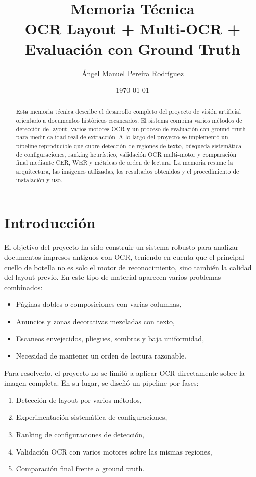 \documentclass[11pt, a4paper]{article}
\title{Memoria T\'ecnica\\OCR Layout + Multi-OCR + Evaluaci\'on con Ground Truth}
\author{Ángel Manuel Pereira Rodríguez}
\date{\today}
\begin{document}
\maketitle

\begin{abstract}
Esta memoria t\'ecnica describe el desarrollo completo del proyecto de visi\'on artificial
orientado a documentos hist\'oricos escaneados. El sistema combina varios m\'etodos de
detecci\'on de layout, varios motores OCR y un proceso de evaluaci\'on con ground truth
para medir calidad real de extracci\'on. A lo largo del proyecto se implement\'o un pipeline
reproducible que cubre detecci\'on de regiones de texto, b\'usqueda sistem\'atica de
configuraciones, ranking heur\'istico, validaci\'on OCR multi-motor y comparaci\'on final
mediante CER, WER y m\'etricas de orden de lectura. La memoria resume la arquitectura,
las im\'agenes utilizadas, los resultados obtenidos y el procedimiento de instalaci\'on y uso.
\end{abstract}

\tableofcontents
\listoffigures
\listoftables
\clearpage

\section{Introducci\'on}

El objetivo del proyecto ha sido construir un sistema robusto para analizar documentos
impresos antiguos con OCR, teniendo en cuenta que el principal cuello de botella no es solo
el motor de reconocimiento, sino tambi\'en la calidad del layout previo. En este tipo de
material aparecen varios problemas combinados:

\begin{itemize}
    \item P\'aginas dobles o composiciones con varias columnas,
    \item Anuncios y zonas decorativas mezcladas con texto,
    \item Escaneos envejecidos, pliegues, sombras y baja uniformidad,
    \item Necesidad de mantener un orden de lectura razonable.
\end{itemize}

Para resolverlo, el proyecto no se limit\'o a aplicar OCR directamente sobre la imagen
completa. En su lugar, se dise\~n\'o un pipeline por fases:

\begin{enumerate}
    \item Detecci\'on de layout por varios m\'etodos,
    \item Experimentaci\'on sistem\'atica de configuraciones,
    \item Ranking de configuraciones de detecci\'on,
    \item Validaci\'on OCR con varios motores sobre las mismas regiones,
    \item Comparaci\'on final frente a ground truth.
\end{enumerate}
\end{document}
